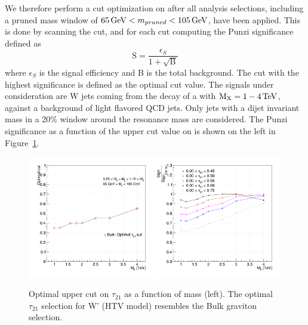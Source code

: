 We therefore perform a cut optimization on \nsubj after all analysis selections, including a pruned mass window of $65 \,\text{Ge\hspace{-.08em}V} < m_{pruned} < 105 \,\text{Ge\hspace{-.08em}V}$, have been applied. This is done by scanning the \nsubj cut, and for each cut computing the Punzi significance~\cite{Punzi:2003bu} defined as
\begin{equation*}
\textrm{S} = \frac{\epsilon_S}{1+\sqrt{\textrm{B}}}  
\end{equation*}  
where $\epsilon_S$ is the signal efficiency and B is the total background. The cut with the highest significance is defined as the optimal cut value. The signals under consideration are W jets coming from the decay of a \BulkG with $\text{M}_{\text{X}} = 1-4 \,\text{Te\hspace{-.08em}V}$, against a background of light flavored QCD jets. Only jets with a dijet invariant mass in a 20\% window around the resonance mass are considered. The Punzi significance as a function of the upper cut value on \nsubj is shown on the left in Figure~\ref{fig:searchI:tau21_punzi}.

\begin{figure}[h!]
\begin{center}
\includegraphics[width=0.49\textwidth]{figures/analysis/search1/AN-15-196/tau21optimisation/HP_Punzi_BulkWW.png}
\includegraphics[width=0.49\textwidth]{figures/analysis/search1/AN-15-196/tau21optimisation/HP_CutSignificance_bulkWW.png}\\
\caption{Optimal upper cut on $\tau_{21}$ as a function of \BulkG mass (left).  The optimal $\tau_{21}$ selection for W' (HTV model) resembles the Bulk graviton selection.}
\label{fig:searchI:tau21_punzi}
\end{center}
\end{figure}

